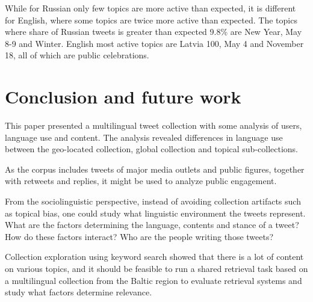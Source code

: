 \documentclass{IOS-Book-Article}
\newcommand{\hl}[1]{#1}
\begin{document}
While for Russian only few topics are more active than expected, it is different for English, where some topics are twice more active than expected. The topics where share of Russian tweets is greater than expected \hl{9.8\%} are New Year, May 8-9 and Winter. English most active topics are Latvia 100, May 4 and November 18, all of which are public celebrations. 




\section{Conclusion and future work}
\label{sec:conclusion}


This paper presented a multilingual tweet collection with some analysis of users, language use and content. The analysis revealed differences in language use between the geo-located collection, global collection and topical sub-collections.


As the corpus includes tweets of major media outlets and public figures, together with retweets and replies, it might be used to analyze public engagement.

From the sociolinguistic perspective, instead of avoiding collection artifacts such as topical bias, one could study what linguistic environment the tweets represent. What are the factors determining the language, contents and stance of a tweet? How do these factors interact? Who are the people writing those tweets?

Collection exploration using keyword search showed that there is a lot of content on various topics, and it should be feasible to run a shared retrieval task based on a multilingual collection from the Baltic region to evaluate retrieval systems and study what factors determine relevance.





\end{document}
